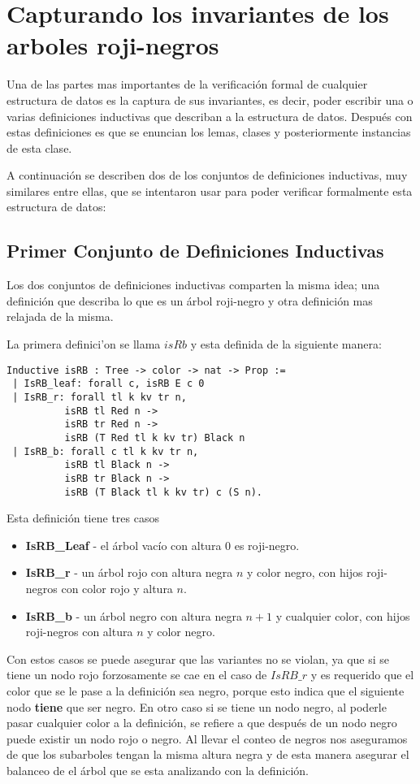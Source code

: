 \documentclass[letterpaper,12pt,oneside]{book}
\newcommand{\arn}{árbol roji-negro }
\newcommand{\arns}{arboles roji-negros }
\theoremstyle{plain}
\theoremstyle{definition}
\theoremstyle{remark}
\begin{document}
\section{Capturando los invariantes de los \arns}
Una de las partes mas importantes de la verificaci\'on formal de cualquier estructura de datos es la captura de sus invariantes,
es decir, poder escribir una o varias definiciones inductivas que describan a la estructura de datos. Después con estas definiciones es que se enuncian 
los lemas, clases y posteriormente instancias de esta clase. 

A continuaci\'on se describen dos de los conjuntos de definiciones inductivas, muy similares entre ellas, que se intentaron usar para poder verificar formalmente esta estructura de datos:
\subsection{Primer Conjunto de Definiciones Inductivas}
Los dos conjuntos de definiciones inductivas comparten la misma idea; una definici\'on que describa lo que es un \arn y otra definici\'on mas relajada de la misma.

La primera definici'on se llama $isRb$ y esta definida de la siguiente manera: 
\begin{verbatim}
Inductive isRB : Tree -> color -> nat -> Prop :=
 | IsRB_leaf: forall c, isRB E c 0
 | IsRB_r: forall tl k kv tr n,
          isRB tl Red n ->
          isRB tr Red n ->
          isRB (T Red tl k kv tr) Black n
 | IsRB_b: forall c tl k kv tr n,
          isRB tl Black n ->
          isRB tr Black n ->
          isRB (T Black tl k kv tr) c (S n).
\end{verbatim}
Esta definici\'on tiene tres casos
\begin{itemize}
        \item \textbf{IsRB\_Leaf} - el árbol vacío con altura 0 es roji-negro.
        \item \textbf{IsRB\_r} - un árbol rojo con altura negra $n$ y color negro, con hijos roji-negros con color rojo y altura $n$.
        \item \textbf{IsRB\_b} - un árbol negro con altura negra $n+1$ y cualquier color, con hijos roji-negros con altura $n$ y color negro.  
\end{itemize}

Con estos casos se puede asegurar que las variantes no se violan, ya que si se tiene un nodo rojo forzosamente se cae en el caso de $IsRB\_r$
y es requerido que el color que se le pase a la definici\'on sea negro, porque esto indica que el siguiente nodo \textbf{tiene} que ser negro. 
En otro caso si se tiene un nodo negro, al poderle pasar cualquier color a la definici\'on, se refiere a que después de un nodo negro
puede existir un nodo rojo o negro. Al llevar el conteo de negros nos aseguramos de que los subarboles tengan la misma altura negra y de esta manera
asegurar el balanceo de el \'arbol que se esta analizando con la definici\'on.
\end{document}
